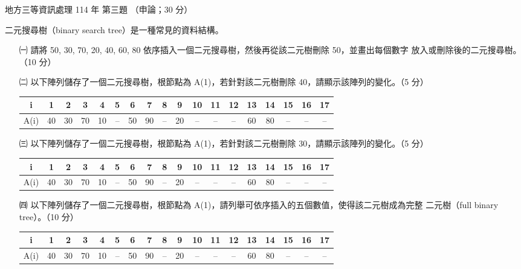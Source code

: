 \begin{pastexam}[label={px:df3-114-ds-03}]{地方三等資訊處理 114 年 第三題}
（申論；30 分）

二元搜尋樹（binary search tree）是一種常見的資料結構。
\begin{enumerate}[leftmargin=2.2em]
\item[㈠] 請將 50, 30, 70, 20, 40, 60, 80 依序插入一個二元搜尋樹，然後再從該二元樹刪除 50，並畫出每個數字
放入或刪除後的二元搜尋樹。（10 分）
\item[㈡] 以下陣列儲存了一個二元搜尋樹，根節點為 A(1)，若針對該二元樹刪除 40，請顯示該陣列的變化。（5 分）
\begin{center}
\small
\begin{tabular}{|c|*{17}{c|}}
\hline
i & 1 & 2 & 3 & 4 & 5 & 6 & 7 & 8 & 9 & 10 & 11 & 12 & 13 & 14 & 15 & 16 & 17 \\
\hline
A(i) & 40 & 30 & 70 & 10 & -- & 50 & 90 & -- & 20 & -- & -- & -- & 60 & 80 & -- & -- & -- \\
\hline
\end{tabular}
\end{center}
\item[㈢] 以下陣列儲存了一個二元搜尋樹，根節點為 A(1)，若針對該二元樹刪除 30，請顯示該陣列的變化。（5 分）
\begin{center}
\small
\begin{tabular}{|c|*{17}{c|}}
\hline
i & 1 & 2 & 3 & 4 & 5 & 6 & 7 & 8 & 9 & 10 & 11 & 12 & 13 & 14 & 15 & 16 & 17 \\
\hline
A(i) & 40 & 30 & 70 & 10 & -- & 50 & 90 & -- & 20 & -- & -- & -- & 60 & 80 & -- & -- & -- \\
\hline
\end{tabular}
\end{center}
\item[㈣] 以下陣列儲存了一個二元搜尋樹，根節點為 A(1)，請列舉可依序插入的五個數值，使得該二元樹成為完整
二元樹（full binary tree）。（10 分）
\begin{center}
\small
\begin{tabular}{|c|*{17}{c|}}
\hline
i & 1 & 2 & 3 & 4 & 5 & 6 & 7 & 8 & 9 & 10 & 11 & 12 & 13 & 14 & 15 & 16 & 17 \\
\hline
A(i) & 40 & 30 & 70 & 10 & -- & 50 & 90 & -- & 20 & -- & -- & -- & 60 & 80 & -- & -- & -- \\
\hline
\end{tabular}
\end{center}
\end{enumerate}
\end{pastexam}

